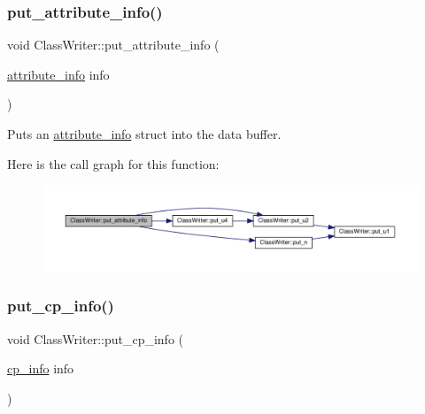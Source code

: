 \subsubsection{\texorpdfstring{put\+\_\+attribute\+\_\+info()}{put\_attribute\_info()}}
{\footnotesize\ttfamily void Class\+Writer\+::put\+\_\+attribute\+\_\+info (\begin{DoxyParamCaption}\item[{\hyperlink{structattribute__info}{attribute\+\_\+info}}]{info }\end{DoxyParamCaption})\hspace{0.3cm}{\ttfamily [private]}}



Puts an \hyperlink{structattribute__info}{attribute\+\_\+info} struct into the data buffer. 

Here is the call graph for this function\+:
\nopagebreak
\begin{figure}[H]
\begin{center}
\leavevmode
\includegraphics[width=350pt]{classClassWriter_aeb256dbd55728dcc9081560691da779b_cgraph}
\end{center}
\end{figure}
\mbox{\label{classClassWriter_a47741e12ae2af256ce3a58a41b2d04d6}} 
\subsubsection{\texorpdfstring{put\+\_\+cp\+\_\+info()}{put\_cp\_info()}}
{\footnotesize\ttfamily void Class\+Writer\+::put\+\_\+cp\+\_\+info (\begin{DoxyParamCaption}\item[{\hyperlink{structcp__info}{cp\+\_\+info}}]{info }\end{DoxyParamCaption})\hspace{0.3cm}{\ttfamily [private]}}

